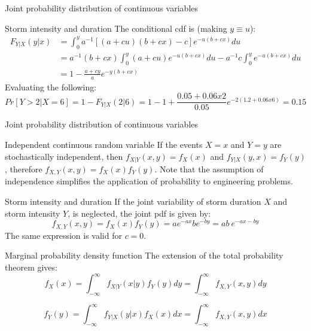 \documentclass[8pt]{beamer}
\renewcommand{\emph}[1]{\textcolor{myorange}{#1}}
\begin{document}
\begin{frame}{Joint probability distribution of continuous variables}
    \begin{exampleblock}{Storm intensity and duration}
        The conditional cdf is (making $y \equiv u$):
         \begin{align*}
             \displaystyle
             F_{Y|X} (y|x) &= \int_0^y a^{-1}\left[ (a+cu)(b+cx)-c \right]e^{-u(b+cx)} du\\
            &= a^{-1}(b+cx)\int_0^y (a + cu)e^{-u(b+cx)}du -a^{-1} c \int_0^y  e^{-u(b+cx)}du \\
            &= 1-\frac{a+cy}{a}e^{-y(b+cx)}
        \end{align*}
        Evaluating the following:
\[
    Pr[Y> 2 | X=6] = 1- F_{Y|X} (2|6) = 1 - 1 + \frac{0.05 + 0.06 x 2}{0.05} e^{-2(1.2+0.06 x 6)} = 0.15
\]
    \end{exampleblock}
\end{frame}

\begin{frame}{Joint probability distribution of continuous variables}
    \begin{block}{Independent continuous random variable}
        If the events $X=x$ and $Y=y$ are stochastically independent, then $f_{X|Y} (x,y) = f_X (x)$ and $f_{Y|X} (y,x) = f_Y (y)$, therefore $f_{X,Y} (x,y) = f_X (x) f_Y (y)$. 
        Note that the assumption of independence simplifies the application of probability to engineering problems. 
    \end{block}
    
    \begin{exampleblock}{Storm intensity and duration}
        If the joint variability of storm duration  $X$ and storm intensity $Y$, is neglected, the joint \emph{pdf} is given by:
        \[
            f_{X,Y} (x,y) = f_X (x) f_Y (y) = a e^{-ax} b e^{-by} = ab \ e^{-ax-by}
        \]
        The same expression is valid for $c=0$.
    \end{exampleblock}
    \begin{block}{Marginal probability density function}
        The extension of the \emph{total probability theorem} gives:
        \[
            \displaystyle
            f_X (x) = \int_{-\infty}^{\infty} f_{X|Y} (x|y) f_Y (y) dy = \int_{-\infty}^{\infty} f_{X,Y} (x,y) dy
        \]

        \[
            \displaystyle
            f_Y (y) = \int_{-\infty}^{\infty} f_{Y|X} (y|x) f_X (x) dx = \int_{-\infty}^{\infty} f_{X,Y} (x,y) dx
        \]
    \end{block}
\end{frame}
\end{document}

